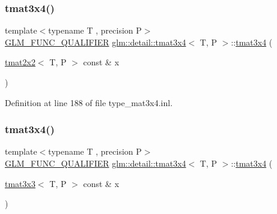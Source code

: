 \mbox{\label{structglm_1_1detail_1_1tmat3x4_aacf61908e9f0d43b3cb3633ff642492f}} 
\subsubsection{\texorpdfstring{tmat3x4()}{tmat3x4()}\hspace{0.1cm}{\footnotesize\ttfamily [11/22]}}
{\footnotesize\ttfamily template$<$typename T , precision P$>$ \\
\hyperlink{setup_8hpp_a33fdea6f91c5f834105f7415e2a64407}{G\+L\+M\+\_\+\+F\+U\+N\+C\+\_\+\+Q\+U\+A\+L\+I\+F\+I\+ER} \hyperlink{structglm_1_1detail_1_1tmat3x4}{glm\+::detail\+::tmat3x4}$<$ T, P $>$\+::\hyperlink{structglm_1_1detail_1_1tmat3x4}{tmat3x4} (\begin{DoxyParamCaption}\item[{\hyperlink{structglm_1_1detail_1_1tmat2x2}{tmat2x2}$<$ T, P $>$ const \&}]{x }\end{DoxyParamCaption})\hspace{0.3cm}{\ttfamily [explicit]}}



Definition at line 188 of file type\+\_\+mat3x4.\+inl.

\mbox{\label{structglm_1_1detail_1_1tmat3x4_aed8d51605e3f1eff1a600430a30e99b8}} 
\subsubsection{\texorpdfstring{tmat3x4()}{tmat3x4()}\hspace{0.1cm}{\footnotesize\ttfamily [12/22]}}
{\footnotesize\ttfamily template$<$typename T , precision P$>$ \\
\hyperlink{setup_8hpp_a33fdea6f91c5f834105f7415e2a64407}{G\+L\+M\+\_\+\+F\+U\+N\+C\+\_\+\+Q\+U\+A\+L\+I\+F\+I\+ER} \hyperlink{structglm_1_1detail_1_1tmat3x4}{glm\+::detail\+::tmat3x4}$<$ T, P $>$\+::\hyperlink{structglm_1_1detail_1_1tmat3x4}{tmat3x4} (\begin{DoxyParamCaption}\item[{\hyperlink{structglm_1_1detail_1_1tmat3x3}{tmat3x3}$<$ T, P $>$ const \&}]{x }\end{DoxyParamCaption})\hspace{0.3cm}{\ttfamily [explicit]}}



